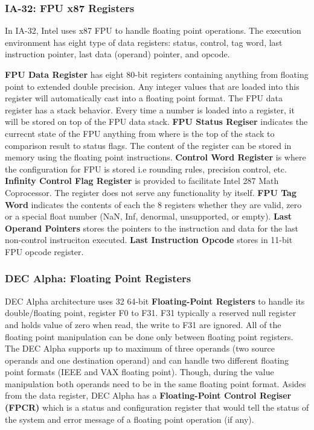 \documentclass[letterpaper,10pt,titlepage]{article}
\begin{document}
\subsubsection{IA-32: FPU x87 Registers}
In IA-32, Intel uses x87 FPU to handle floating point operations. The
execution environment has eight type of data registers: status, control,
tag word, last instruction pointer, last data (operand) pointer, and opcode.
\par
\textbf{FPU Data Register} has eight 80-bit registers containing anything
from floating point to extended double precision. Any integer values that are
loaded into this register will automatically cast into a floating point 
format. The FPU data register has a stack behavior. Every time a number is
loaded into a register, it will be stored on top of the FPU data stack. 
\textbf{FPU Status Regiser} indicates the currecnt state of the FPU anything
from where is the top of the stack to comparison result to status flags.  
The content of the register can be stored in memory using the floating point
instructions. \textbf{Control Word Register} is where the configuration for 
FPU is stored i.e rounding rules, precision control, etc. \textbf{Infinity
Control Flag Register} is provided to facilitate Intel 287 Math Coprocessor. 
The register does not serve any functionality by itself. \textbf{FPU Tag Word}
indicates the contents of each the 8 registers whether they are valid, zero or 
a special float number (NaN, Inf, denormal, unsupported, or empty). \textbf{Last 
Operand Pointers} stores the pointers to the instruction and data for the last
non-control instruciton executed. \textbf{Last Instruction Opcode} stores in 
11-bit FPU opcode register. 


\subsubsection{DEC Alpha: Floating Point Registers}
DEC Alpha architecture uses 32 64-bit \textbf{Floating-Point Registers} to handle its 
double/floating point, register F0 to F31. F31 typically a reserved null register
and holds value of zero when read, the write to F31 are ignored. All 
of the floating point manipulation can be done only between floating point 
registers. The DEC Alpha supports up to maximum of three operands
(two source operands and one destination operand) and can handle 
two different floating point formats (IEEE and VAX floating point). 
Though, during the value manipulation both operands need to be in the same
floating point format. Asides from the data register, DEC Alpha has a \textbf{Floating-Point 
Control Regiser (FPCR)} which is a status and configuration register that would
tell the status of the system and error message of a floating point operation (if any).
\par
\end{document}
